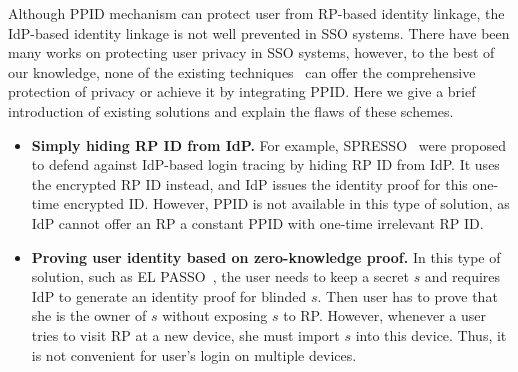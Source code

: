 Although PPID mechanism can protect user from RP-based identity linkage, the IdP-based identity linkage is not well prevented in SSO systems.
There have been many works on protecting user privacy in SSO systems, however, to the best of our knowledge, none of the existing techniques~\cite{SPRESSO, BrowserID, ZhangKSZR21, IsaakidisHD16} can offer the comprehensive protection of privacy or achieve it by integrating PPID. 
Here we give a brief introduction of existing solutions
and explain the flaws of these schemes. 
\begin{itemize}
\item {\noindent\textbf{Simply hiding RP ID from IdP. }}For example, SPRESSO~\cite{SPRESSO} were proposed to defend against IdP-based login tracing by hiding RP ID from IdP. It uses the encrypted RP ID instead, and IdP issues the identity proof for this one-time encrypted ID. 
However, PPID is not available in this type of solution, as IdP cannot offer an RP a constant PPID with one-time irrelevant RP ID.
\item {\noindent\textbf{Proving user identity based on zero-knowledge proof. }}In this type of solution, such as EL PASSO~\cite{ZhangKSZR21}, the user needs to keep a secret $s$ and requires IdP to generate an identity proof for blinded $s$. Then user has to prove that she is the owner of $s$ without exposing $s$ to RP. 
However, whenever a user tries to visit RP at a new device, she must import  $s$ into this device. Thus, it is not convenient for user's login on multiple devices. 
\end{itemize}



